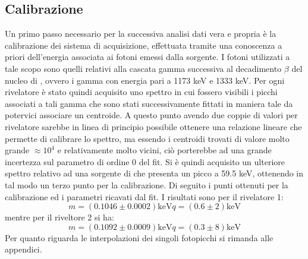 \subsection{Calibrazione}
Un primo passo necessario per la successiva analisi dati vera e propria è la calibrazione dei sistema di acquisizione, effettuata tramite una conoscenza a priori dell'energia
associata ai fotoni emessi dalla sorgente. I fotoni utilizzati a tale scopo sono quelli relativi alla cascata gamma successiva al decadimento $\beta$ del nucleo di , ovvero
i gamma con energia pari a 1173 keV e 1333 keV. Per ogni rivelatore è stato quindi acquisito uno spettro in cui fossero visibili i picchi associati a tali gamma che sono stati
successivamente fittati in maniera tale da potervici associare un centroide. A questo punto avendo due coppie di valori per rivelatore sarebbe in linea di principio possibile
ottenere una relazione lineare che permette di calibrare lo spettro, ma essendo i centroidi trovati di valore molto grande $\approx 10^4$ e relativamente molto vicini, ciò
porterebbe ad una grande incertezza sul parametro di ordine 0 del fit. Si è quindi acquisito un ulteriore spettro relativo ad una sorgente di  
che presenta 
un picco a 59.5 keV, ottenendo in tal modo un terzo punto per la calibrazione. Di seguito i punti ottenuti per la calibrazione ed i parametri ricavati dal fit. I risultati sono
per il rivelatore 1:
$$ m = (0.1046 \pm 0.0002) \text{keV} q = (0.6 \pm 2) \text{keV}$$
mentre per il riveltore 2 si ha:
$$ m = (0.1092 \pm 0.0009) \text{keV} q = (0.3 \pm 8) \text{keV}$$
Per quanto riguarda le interpolazioni dei singoli fotopicchi si rimanda alle appendici.



